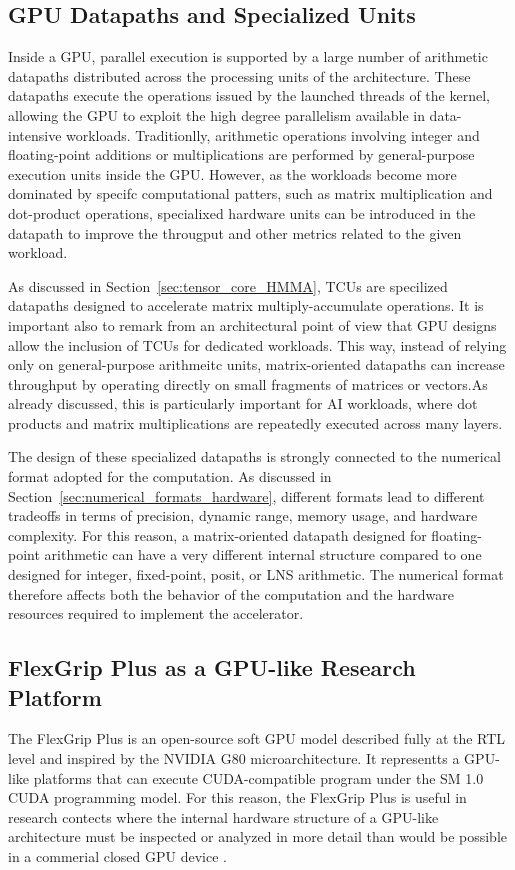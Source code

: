 \subsection{GPU Datapaths and Specialized Units}
Inside a GPU, parallel execution is supported by a large number of arithmetic datapaths distributed across the processing units of the architecture. These datapaths execute the operations issued by the launched threads of the kernel, allowing the GPU to exploit the high degree parallelism available in data-intensive workloads. Traditionlly, arithmetic operations involving integer and floating-point additions or multiplications are performed by general-purpose execution units inside the GPU. However, as the workloads become more dominated by specifc computational patters, such as matrix multiplication and dot-product operations, specialixed hardware units can be introduced in the datapath to improve the througput and other metrics related to the given workload.

As discussed in Section~\ref{sec:tensor_core_HMMA}, TCUs are specilized datapaths designed to accelerate matrix multiply-accumulate operations. It is important also to remark from an architectural point of view that GPU designs  allow the inclusion of TCUs for dedicated workloads.  This way, instead of relying only on general-purpose arithmeitc units, matrix-oriented datapaths can increase throughput by operating directly on small fragments of matrices or vectors.As already discussed, this is particularly important for AI workloads, where dot products and matrix multiplications are repeatedly executed across many layers.

The design of these specialized datapaths is strongly connected to the numerical format adopted for the computation. As discussed in Section~\ref{sec:numerical_formats_hardware}, different formats lead to different tradeoffs in terms of precision, dynamic range, memory usage, and hardware complexity. For this reason, a matrix-oriented datapath designed for floating-point arithmetic can have a very different internal structure compared to one designed for integer, fixed-point, posit, or LNS arithmetic. The numerical format therefore affects both the behavior of the computation and the hardware resources required to implement the accelerator.

\subsection{FlexGrip Plus as a GPU-like Research Platform}
The FlexGrip Plus is an open-source soft GPU model described fully at the RTL level and inspired by the NVIDIA G80 microarchitecture. It representts a GPU-like platforms that can execute CUDA-compatible program under the SM 1.0 CUDA programming model. For this reason, the FlexGrip Plus is useful in research contects where the internal hardware structure of a GPU-like architecture must be inspected or analyzed in more detail than would be possible in a commerial closed GPU device \cite{condia2020flexgripplus}.

